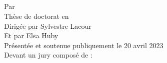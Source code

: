 

\begin{mytitlepage}

	\begin{center}
		
		\vspace*{0.3cm}
		\LARGE\textbf{\univname} \\
		\vspace{0.2cm}
		\Large\textbf{\schoolname} \\
		\vspace{0.3cm}
		\Large\textbf{\labname} \\
		\vspace{1cm}
		\huge{\textbf{\ttitle}} \\
		\vspace{0.8cm}
		\large{Par \authorname} \\
		\vspace{0.6cm}
		\large{Thèse de doctorat en \subjectname} \\
		\vspace{0.6cm}
		\large{Dirigée par Sylvestre Lacour} \\
		\large{Et par Elsa Huby} \\
		
		\normalsize
		\vspace{0.7cm}
		Présentée et soutenue publiquement le 20 avril 2023 \\
		\vspace{0.7cm}
		Devant un jury composé de :
		
		\newlength{\espacejury}
		\setlength{\espacejury}{0.1cm}
		
		\small
		

\end{center}
\end{mytitlepage}
